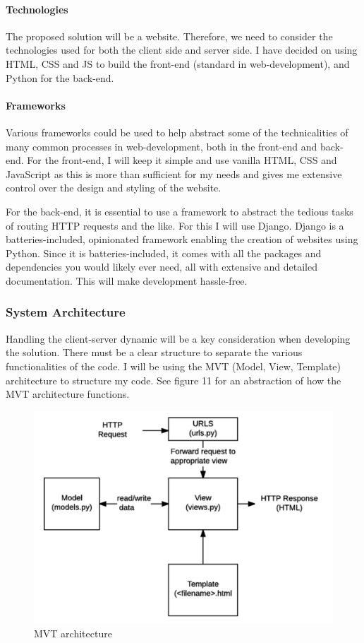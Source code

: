 \documentclass{article}
\begin{document}
\paragraph{Technologies}

The proposed solution will be a website. Therefore, we need to consider the technologies used for both the client side and server side. I have decided on using HTML, CSS and JS to build the front-end (standard in web-development), and Python for the back-end.

\paragraph{Frameworks}

Various frameworks could be used to help abstract some of the technicalities of many common processes in web-development, both in the front-end and back-end. For the front-end, I will keep it simple and use vanilla HTML, CSS and JavaScript as this is more than sufficient for my needs and gives me extensive control over the design and styling of the website. 

For the back-end, it is essential to use a framework to abstract the tedious tasks of routing HTTP requests and the like. For this I will use Django. Django is a batteries-included, opinionated framework enabling the creation of websites using Python. Since it is batteries-included, it comes with all the packages and dependencies you would likely ever need, all with extensive and detailed documentation. This will make development hassle-free. 

\subsubsection{System Architecture}

Handling the client-server dynamic will be a key consideration when developing the solution. There must be a clear structure to separate the various functionalities of the code. I will be using the MVT (Model, View, Template) architecture to structure my code. See figure 11 for an abstraction of how the MVT architecture functions.

\begin{figure}
  \centering
  \includegraphics[width=1\textwidth]{img/Figure 11.png}
  \caption{MVT architecture}
\end{figure}
\end{document}

